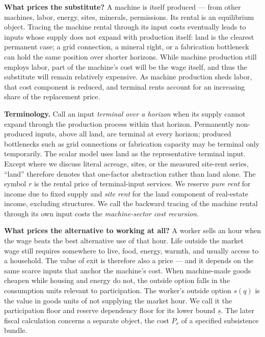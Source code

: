 \documentclass[12pt]{article}
\theoremstyle{plain}
\begin{document}
\textbf{What prices the substitute?} A machine is itself produced --- from other machines, labor, energy, sites, minerals, permissions. Its rental is an equilibrium object. Tracing the machine rental through its input costs eventually leads to inputs whose supply does not expand with production itself: land is the clearest permanent case; a grid connection, a mineral right, or a fabrication bottleneck can hold the same position over shorter horizons. While machine production still employs labor, part of the machine's cost will be the wage itself, and thus the substitute will remain relatively expensive. As machine production sheds labor, that cost component is reduced, and terminal rents account for an increasing share of the replacement price.

\textbf{Terminology.} Call an input \emph{terminal over a horizon} when its
supply cannot expand through the production process within that horizon.
Permanently non-produced inputs, above all land, are terminal at every
horizon; produced bottlenecks such as grid connections or fabrication
capacity may be terminal only temporarily. The scalar model uses land as the
representative terminal input. Except where we discuss literal acreage,
sites, or the measured site-rent series, ``land'' therefore denotes that
one-factor abstraction rather than land alone. The symbol $r$ is the rental
price of terminal-input services. We reserve \emph{pure rent} for income due
to fixed supply and \emph{site rent} for the land component of real-estate
income, excluding structures. We call the backward tracing of the machine
rental through its own input costs the \emph{machine-sector cost recursion}.

\textbf{What prices the alternative to working at all?} A worker sells an hour when the wage beats the best alternative use of that hour. Life outside the market wage still requires somewhere to live, food, energy, warmth, and usually access to a household. The value of exit is therefore also a price --- and it depends on the same scarce inputs that anchor the machine's cost. When machine-made goods cheapen while housing and energy do not, the outside option falls in the consumption units relevant to participation. The worker's outside option $s(q)$ is the value in goods units of not supplying the market hour. We call it the participation floor and reserve dependency floor for its lower bound $\underline{s}$. The later fiscal calculation concerns a separate object, the cost $P_s$ of a specified subsistence bundle.
\end{document}
